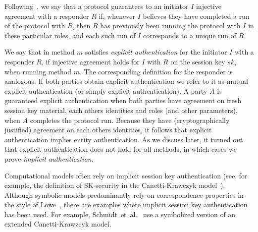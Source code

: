  
\label{sec:authenticationDef}
Following~\cite{DBLP:conf/csfw/Lowe97a}, we say that a protocol guarantees to an
initiator $I$ injective agreement with a responder $R$ if, whenever $I$ believes
they have completed a run of the protocol with $R$, then $R$ has previously been
running the protocol with $I$ in these particular roles, and each such run of
$I$ corresponds to a unique run of $R$.

%
We say that \mEdhoc{} in method $m$ satisfies \emph{explicit authentication} for
the initiator $I$ with a responder $R$, if injective agreement holds for $I$
with $R$ on the session key $sk$, when running method $m$.
%
The corresponding definition for the responder is analogous.
%
If both parties obtain explicit authentication we refer to it as mutual explicit
authentication (or simply explicit authentication).
%
A party $A$ is guaranteed explicit authentication when both parties have
agreement on fresh session key material, each others identities and roles
(and other parameters), when $A$ completes the protocol run.
%
Because they have (cryptographically justified) agreement on each others
identities, it follows that explicit authentication implies entity
authentication.
%
As we discuss later, it turned out that explicit authentication does not hold for all
\mEdhoc{} methods, in which cases we prove \emph{implicit authentication}.

Computational models often rely on implicit session key authentication
(see, for example, the definition of SK-security in the Canetti-Krawczyk
model~\cite{DBLP:conf/crypto/CanettiK02}).
%
Although symbolic models predominantly rely on correspondence properties
in the style of Lowe~\cite{DBLP:conf/csfw/Lowe97a}, there are examples where
implicit session key authentication has been used.
%
For example, Schmidt~et~al.~\cite{DBLP:conf/csfw/SchmidtMCB12} use a
symbolized version of an extended Canetti-Krawzcyk model.

